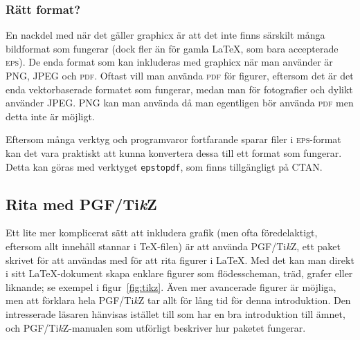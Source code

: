 \documentclass[swe,12pt]{skrapport}
\newcommand\PDF{\textsc{pdf}}							%
\newcommand\EPS{\textsc{eps}}							%
\newcommand\cli[1]{\texttt{#1}}							%
\newcommand\pack[1]{\textsf{#1}}						%
\newcommand\pdfLaTeX{\hologo{pdfLaTeX}}					%
\newcommand\PGFTikZ{PGF/Ti\emph{k}Z}					%
\begin{document}
	\subsubsection{Rätt format?}
	En nackdel med \pdfLaTeX{} när det gäller \pack{graphicx} är att det inte
	finns särskilt många bildformat som fungerar (dock fler än för gamla
	\LaTeX{}, som bara accepterade \EPS). De enda format som kan inkluderas
	med \pack{graphicx} när man använder \pdfLaTeX{} är \textsc{PNG},
	\textsc{JPEG} och \PDF. Oftast vill man använda \PDF{} för figurer,
	eftersom
	det är det enda vektorbaserade formatet som fungerar, medan man för
	fotografier och dylikt använder \textsc{JPEG}. \textsc{PNG} kan man
	använda då man egentligen bör använda \PDF{} men detta inte är möjligt.
	
	Eftersom många verktyg och programvaror fortfarande sparar filer i
	\EPS-format kan det vara praktiskt att kunna konvertera dessa till ett
	format som fungerar. Detta kan göras med verktyget \cli{epstopdf}, som
	finns tillgängligt på CTAN.
	
	\subsection{Rita med \PGFTikZ}
	Ett lite mer komplicerat sätt att inkludera grafik (men ofta 
	föredelaktigt, eftersom allt innehåll stannar i \TeX-filen) är att använda
	\PGFTikZ, ett paket skrivet för att användas med \pdfLaTeX{} för att rita
	figurer i \LaTeX{}. Med det kan man direkt i sitt \LaTeX-dokument skapa
	enklare figurer som flödesscheman, träd, grafer eller liknande; se exempel
	i figur~\vref{fig:tikz}. Även mer avancerade figurer är möjliga, men att
	förklara hela \PGFTikZ{} tar allt för lång tid för denna introduktion. Den
	intresserade läsaren hänvisas istället till  som har
	en bra introduktion till ämnet, och \PGFTikZ-manualen \cite{Tantau10} som
	utförligt beskriver hur paketet fungerar.
	
\end{document}
